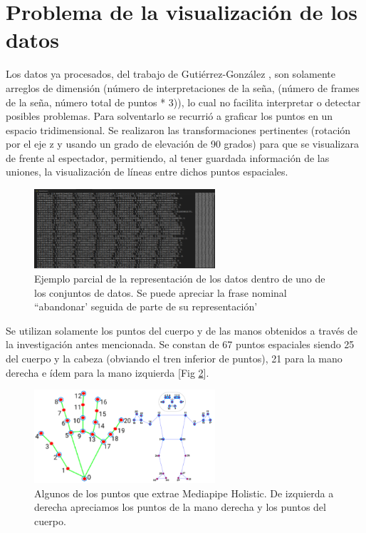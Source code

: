 \section{Problema de la visualización de los datos}
Los datos ya procesados, del trabajo de Gutiérrez-González , son solamente arreglos de dimensión (número de interpretaciones de la seña, (número de frames de la seña,  número total de puntos * 3)), lo cual no facilita  interpretar o detectar posibles problemas. Para solventarlo se recurrió a graficar los puntos en un espacio tridimensional. Se realizaron las transformaciones pertinentes (rotación por el eje z y usando un grado de elevación de 90 grados)  para que se visualizara de frente al espectador, permitiendo, al tener guardada información de las uniones, la visualización de líneas entre dichos puntos espaciales.

\begin{figure}[ht!]
    \centering
    \includegraphics[width=0.6\textwidth]{Graphics/data_example.png}
    \caption{Ejemplo parcial de la representación de los datos dentro de uno de los conjuntos de datos. Se puede apreciar la frase nominal ``abandonar' seguida de parte de su representación'}
    \label{fig:data_example}
\end{figure}


Se utilizan solamente los puntos del cuerpo y de las manos obtenidos a través de la investigación antes mencionada. Se constan de 67 puntos espaciales siendo 25 del cuerpo y la cabeza (obviando el tren inferior de puntos), 21 para la mano derecha e ídem para la mano izquierda [Fig \ref{fig:points}]. 

\begin{figure}[ht!]
    \centering
    \includegraphics[width=0.6\textwidth]{Graphics/points.png}
    \caption{Algunos de los puntos que extrae Mediapipe Holistic. De izquierda a derecha apreciamos los puntos de la mano derecha y los puntos del cuerpo.}
    \label{fig:points}
\end{figure}

